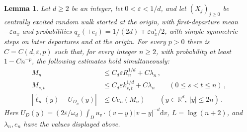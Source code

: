 \documentclass[11pt]{amsart}
\theoremstyle{plain}
\newtheorem{lemma}[theorem]{Lemma}
\theoremstyle{definition}
\newcommand{\R}{\mathbb R}
\newcommand{\eps}{\varepsilon}
\newcommand{\dd}{\mathrm d}
\begin{document}
\begin{lemma}\label{lem:local}
Let $d\geq2$ be an integer, let $0<\eps<1/d$, and let $(X_j)_{j\geq0}$ be
centrally excited random walk started at the origin, with first-departure mean $-\eps u_x$
and probabilities $q_x(\pm e_i)=1/(2d)\mp\eps u_x^i/2$,
with simple symmetric steps on later departures and at the origin.
For every $p>0$ there is $C=C(d,\eps,p)$ such that, for every integer
$n\geq2$, with probability at least $1-Cn^{-p}$, the following estimates
hold simultaneously:
\begin{align}
M_n&\leq C_d\eps R_n^{1/d}+C\lambda_n\, ,\label{eq:M}\\
M_{s,t}&\leq C_d\eps k_{s,t}^{1/d}+C\lambda_n
\qquad(0\leq s<t\leq n)\, ,\label{eq:interval}\\
|\widetilde\ell_n(y)-U_{D_n}(y)|&\leq C e_n(M_n)
\qquad(y\in\R^d,\ |y|\leq2n)\, .\label{eq:approx}
\end{align}
Here $U_D(y)=(2\eps/\omega_d)\int_D u_v\cdot(v-y)|v-y|^{-d}\dd v$,
$L=\log(n+2)$, and $\lambda_n,e_n$ have the values displayed above.
\end{lemma}
\end{document}
